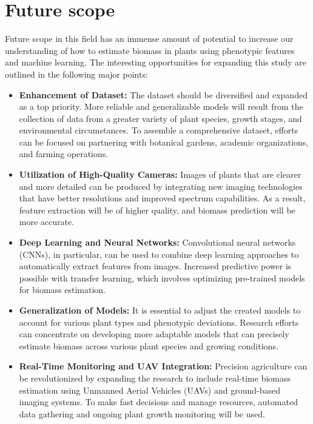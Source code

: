 \documentclass[a4paper,12pt]{report}%
\renewcommand{\\}{\vspace*{0.5\baselineskip} \newline}
\begin{document}
\chapter{Future scope}
Future scope in this field has an immense amount of potential to increase our understanding of how to estimate biomass in plants using phenotypic features and machine learning. The interesting opportunities for expanding this study are outlined in the following major points:
\begin{itemize}
    \item \textbf{Enhancement of Dataset:} The dataset should be diversified and expanded as a top priority. More reliable and generalizable models will result from the collection of data from a greater variety of plant species, growth stages, and environmental circumstances. To assemble a comprehensive dataset, efforts can be focused on partnering with botanical gardens, academic organizations, and farming operations.

    \item \textbf{Utilization of High-Quality Cameras:} Images of plants that are clearer and more detailed can be produced by integrating new imaging technologies that have better resolutions and improved spectrum capabilities. As a result, feature extraction will be of higher quality, and biomass prediction will be more accurate.

    \item \textbf{Deep Learning and Neural Networks:} Convolutional neural networks (CNNs), in particular, can be used to combine deep learning approaches to automatically extract features from images. Increased predictive power is possible with transfer learning, which involves optimizing pre-trained models for biomass estimation.

    \item \textbf{Generalization of Models:} It is essential to adjust the created models to account for various plant types and phenotypic deviations. Research efforts can concentrate on developing more adaptable models that can precisely estimate biomass across various plant species and growing conditions.

    \item \textbf{Real-Time Monitoring and UAV Integration:} Precision agriculture can be revolutionized by expanding the research to include real-time biomass estimation using Unmanned Aerial Vehicles (UAVs) and ground-based imaging systems. To make fast decisions and manage resources, automated data gathering and ongoing plant growth monitoring will be used.


\end{itemize}
\end{document}
